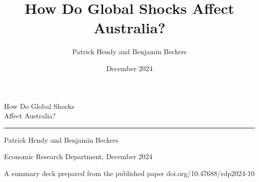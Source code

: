 \documentclass[aspectratio=169,11pt]{beamer}
\title{How Do Global Shocks Affect Australia?}
\author{Patrick Hendy and Benjamin Beckers}
\date{December 2024}
\begin{document}
\begin{frame}[plain]
\vspace*{0.95cm}
{\fontsize{7.8}{10}\selectfont\color{teal}\bfseries{}}\par
\vspace{1.55cm}
{\rmfamily\fontsize{29}{34}\selectfont\color{ink} How Do Global Shocks\\[0.08cm] Affect Australia?\par}
\vspace{0.64cm}
{\color{teal}\rule{3.2cm}{1.5pt}}\par
\vspace{0.48cm}
{\fontsize{12.2}{15}\selectfont\color{ink} Patrick Hendy and Benjamin Beckers\par}
\vspace{0.14cm}
{\fontsize{8.8}{11}\selectfont\color{muted} Economic Research Department, December 2024\par}
\vfill
{\fontsize{7.8}{10}\selectfont\color{muted} A summary deck prepared from the published paper \hfill doi.org/10.47688/rdp2024-10\par}
\vspace{0.78cm}
\end{frame}
\end{document}
